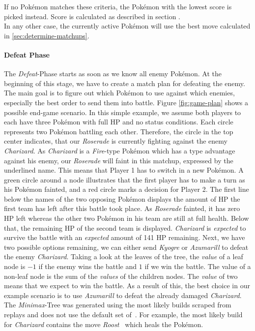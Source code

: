 If no Pokémon matches these criteria, the Pokémon with the lowest score is picked instead.
Score is calculated as described in section . \\
In any other case, the currently active Pokémon will use the best move calculated in \ref{sec:determine-matchups}.

\paragraph{Defeat Phase}
\label{sec:defeat-phase}
The \textit{Defeat}-Phase starts as soon as we know all enemy Pokémon. At the beginning of this stage, we have to create
a match plan for defeating the enemy. The main goal is to figure out which Pokémon to use against which enemies, especially
the best order to send them into battle. 
Figure \ref{fig:game-plan} shows a possible end-game scenario. In this simple example, we assume both players to each
have three Pokémon with full \ac{HP} and no status conditions. Each circle represents two Pokémon battling each other.
Therefore, the circle in the top center indicates, that our \textit{Roserade} is currently fighting against the enemy
\textit{Charizard}. As \textit{Charizard} is a \textit{Fire}-type Pokémon which has a type advantage against his enemy,
our \textit{Roserade} will faint in this matchup, expressed by the underlined name. This means that Player 1 has to
switch in a new Pokémon. A green circle around a node illustrates that the first player has to make a turn as his 
Pokémon fainted, and a red circle marks a decision for Player 2. The first line below the names of the two opposing
Pokémon displays the amount of \ac{HP} the first team has left after this battle took place. As \textit{Roserade} fainted,
it has zero \ac{HP} left whereas the other two Pokémon in his team are still at full health. Below that, the remaining 
\ac{HP} of the second team is displayed. \textit{Charizard} is \textit{expected} to survive the battle with an 
\textit{expected} amount of 141 \ac{HP} remaining. Next, we have two possible options remaining, we can either send
\textit{Kyogre} or \textit{Azumarill} to defeat the enemy \textit{Charizard}. Taking a look at the leaves of the tree,
the \textit{value} of a leaf node is $-1$ if the enemy wins the battle and $1$ if we win the battle. 
The value of a non-leaf node is the sum of the \textit{values} of the children nodes. The \textit{value} of two means that we 
expect to win the battle. As a result of this, the best choice in our example scenario is to use \textit{Azumarill} to 
defeat the already damaged \textit{Charizard}. The \textit{Minimax}-Tree was generated using the most likely builds
scraped from replays and does not use the default set of~\cite{Smogon:DamageCalc}. For example, 
the most likely build for \textit{Charizard} contains the move \textit{Roost}~\autocite{Bulbapedia:Roost} which 
heals the Pokémon.

